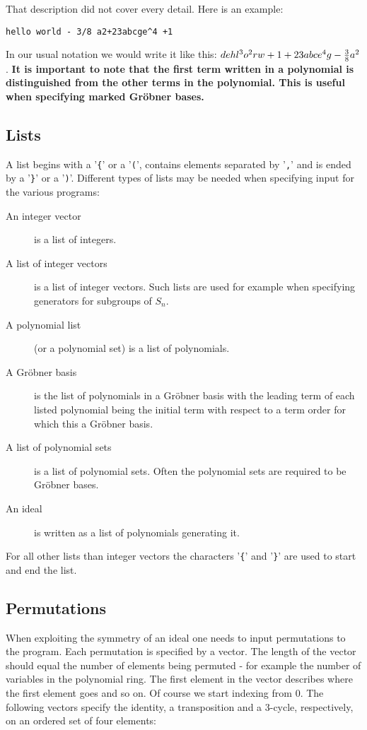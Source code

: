 That description did not cover every detail. Here is an example:
\begin{verbatim}
hello world - 3/8 a2+23abcge^4 +1
\end{verbatim}
In our usual notation we would write it like this: $dehl^{3}o^{2}rw+1+23abce^{4}g-{3\over 8}a^{2}$.
{\bf It is important to note that the first term written in a polynomial is distinguished from the other terms in the polynomial. This is useful when specifying marked Gr\"obner bases.}
\subsection{Lists}
A list begins with a '{\tt \{}' or a '{\tt (}', contains elements separated by '{\tt ,}' and is ended by a  '{\tt \}}' or a '{\tt )}'.
Different types of lists may be needed when specifying input for the various programs:
\begin{description}
\item[An integer vector] is a list of integers.
\item[A list of integer vectors] is a list of integer vectors. Such lists are used for example when specifying generators for subgroups of $S_n$.
\item[A polynomial list] (or a polynomial set) is a list of polynomials.
\item[A Gr\"obner basis]  is the list of polynomials in a Gr\"obner basis with the leading term of each listed polynomial being the initial term with respect to a term order for which this a Gr\"obner basis.
\item[A list of polynomial sets] is a list of polynomial sets. Often the polynomial sets are required to be Gr\"obner bases.
\item[An ideal] is written as a list of polynomials generating it.
\end{description}
For all other lists than integer vectors the characters '{\tt \{}' and '{\tt \}}' are used to start and end the list.

\subsection{Permutations}
When exploiting the symmetry of an ideal one needs to input permutations to the program. Each permutation is specified by a vector. The length of the vector should equal the number of elements being permuted - for example the number of variables in the polynomial ring.
The first element in the vector describes where the first element goes and so on. Of course we start indexing from $0$. The following vectors specify the identity, a transposition and a 3-cycle, respectively, on an ordered set of four elements:

